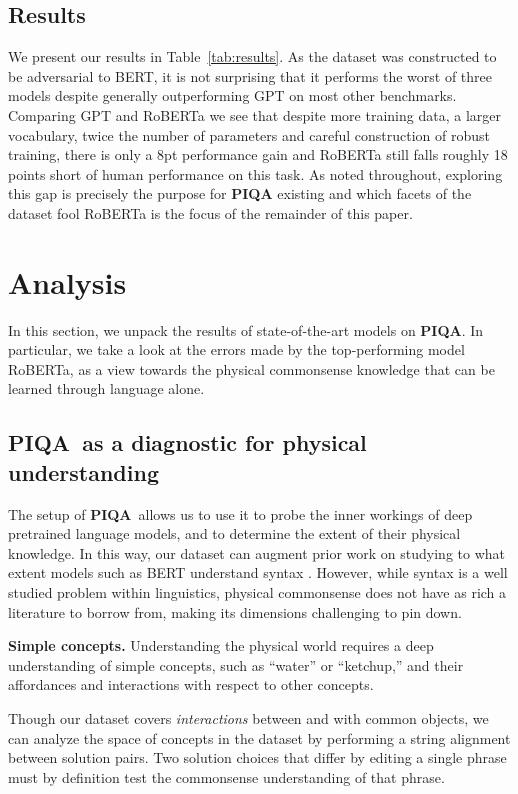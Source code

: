 \subsection{Results}

We present our results in Table~\ref{tab:results}.  As the dataset was constructed to be adversarial to BERT, it is not surprising that it performs the worst of three models despite generally outperforming GPT on most other benchmarks.  Comparing GPT and RoBERTa we see that despite more training data, a larger vocabulary, twice the number of parameters and careful construction of robust training, there is only a 8pt performance gain and RoBERTa still falls roughly 18 points short of human performance on this task.  As noted throughout, exploring this gap is precisely the purpose for \textbf{PIQA} existing and which facets of the dataset fool RoBERTa is the focus of the remainder of this paper. 

\section{Analysis}

In this section, we unpack the results of state-of-the-art models on \textbf{PIQA}. In particular, we take a look at the errors made by the top-performing model RoBERTa, as a view towards the physical commonsense knowledge that can be learned through language alone.

\subsection{\textbf{PIQA}~as a diagnostic for physical understanding} The setup of \textbf{PIQA}~allows us to use it to probe the inner workings of deep pretrained language models, and to determine the extent of their physical knowledge. In this way, our dataset can augment prior work on studying to what extent models such as BERT understand syntax \cite{goldberg2019assessing}. However, while syntax is a well studied problem within linguistics, physical commonsense does not have as rich a literature to borrow from, making its dimensions challenging to pin down.

\textbf{Simple concepts.} Understanding the physical world requires a deep understanding of simple concepts, such as ``water'' or ``ketchup,'' and their affordances and interactions with respect to other concepts. 

Though our dataset covers \emph{interactions} between and with common objects, we can analyze the space of concepts in the dataset by performing a string alignment between solution pairs. Two solution choices that differ by editing a single phrase must by definition test the commonsense understanding of that phrase.

